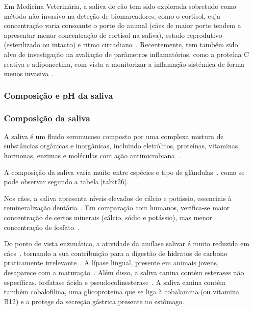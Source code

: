 Em Medicina Veterinária, a saliva de cão tem sido explorada sobretudo como método não invasivo na deteção de biomarcadores, como o cortisol, cuja concentração varia consoante o porte do animal (cães de maior porte tendem a apresentar menor concentração de cortisol na saliva), estado reprodutivo (esterilizado ou intacto) e ritmo circadiano~\cite{damian_serial_2018,pasha_saliva_2018}. Recentemente, tem também sido alvo de investigação na avaliação de parâmetros inflamatórios, como a proteína C reativa e adiponectina, com vista a monitorizar a inflamação sistémica de forma menos invasiva~\cite{pasha_saliva_2018}.

\subsubsection{Composição e pH da saliva}

\subsubsection{Composição da saliva}

A saliva é um fluido seromucoso composto por uma complexa mistura de substâncias orgânicas e inorgânicas, incluindo eletrólitos, proteínas, vitaminas, hormonas, enzimas e moléculas com ação antimicrobiana~\cite{lobprise_oral_2019}. 

A composição da saliva varia muito entre espécies e tipo de glândulas~\cite{Das_Textbook}, como se pode observar segundo a tabela \ref{tab:t26}.

Nos cães, a saliva apresenta níveis elevados de cálcio e potássio, essenciais à remineralização dentária~\cite{pasha_saliva_2018}. Em comparação com humanos, verifica-se maior concentração de certos minerais (cálcio, sódio e potássio), mas menor concentração de fosfato~\cite{pasha_saliva_2018}.

Do ponto de vista enzimático, a atividade da amílase salivar é muito reduzida em cães~\cite{Contreras-Aguilar2017,Hong2019}, tornando a sua contribuição para a digestão de hidratos de carbono praticamente irrelevante~\cite{cunningham,Hornbuckle2008}. A lípase lingual, presente em animais jovens, desaparece com a maturação~\cite{cunningham}. Além disso, a saliva canina contém esterases não específicas, fosfatase ácida e pseudocolinesterase~\cite{cunningham}. A saliva canina contém também cobalofilina, uma glicoproteína que se liga à cobalamina (ou vitamina B12) e a protege da secreção gástrica presente no estômago\cite{Das_Textbook}.

